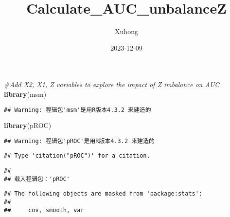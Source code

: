 \documentclass[
]{article}
\title{Calculate\_AUC\_unbalanceZ}
\author{Xuhong}
\date{2023-12-09}
\newenvironment{Shaded}{\begin{snugshade}}{\end{snugshade}}
\newcommand{\CommentTok}[1]{\textcolor[rgb]{0.56,0.35,0.01}{\textit{#1}}}
\newcommand{\FunctionTok}[1]{\textcolor[rgb]{0.13,0.29,0.53}{\textbf{#1}}}
\newcommand{\NormalTok}[1]{#1}
\begin{document}
\maketitle

\begin{Shaded}
\begin{Highlighting}[]
\CommentTok{\#Add X2, X1, Z variables to explore the impact of Z imbalance on AUC}
\FunctionTok{library}\NormalTok{(msm)}
\end{Highlighting}
\end{Shaded}

\begin{verbatim}
## Warning: 程辑包'msm'是用R版本4.3.2 来建造的
\end{verbatim}

\begin{Shaded}
\begin{Highlighting}[]
\FunctionTok{library}\NormalTok{(pROC)}
\end{Highlighting}
\end{Shaded}

\begin{verbatim}
## Warning: 程辑包'pROC'是用R版本4.3.2 来建造的
\end{verbatim}

\begin{verbatim}
## Type 'citation("pROC")' for a citation.
\end{verbatim}

\begin{verbatim}
## 
## 载入程辑包：'pROC'
\end{verbatim}

\begin{verbatim}
## The following objects are masked from 'package:stats':
## 
##     cov, smooth, var
\end{verbatim}
\end{document}
